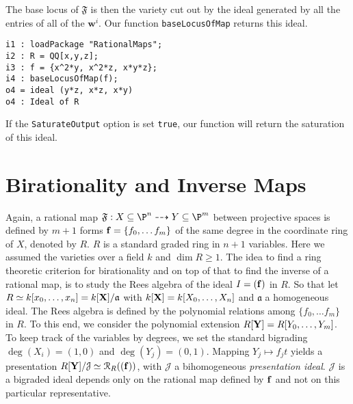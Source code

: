 \documentclass[11pt]{amsart}
\numberwithin{equation}{theorem}
\def\ff{{\bf f}}
\def\XX{{\bf X}}
\def\YY{{\bf Y}}
\renewcommand{\:}{\colon}
\theoremstyle{theorem}
\begin{document}
The base locus of $\mathfrak{F}$ is then the variety cut out by the ideal generated by all the entries of all of the $\mathbf w^i$. Our function {\tt baseLocusOfMap}  returns this ideal.
{\scriptsize\color{blue}
\begin{verbatim}
i1 : loadPackage "RationalMaps";
i2 : R = QQ[x,y,z];
i3 : f = {x^2*y, x^2*z, x*y*z};
i4 : baseLocusOfMap(f);
o4 = ideal (y*z, x*z, x*y)
o4 : Ideal of R
\end{verbatim}
}
{\normalsize}
If the \verb=SaturateOutput= option is set {\tt true}, our function will return the saturation of this ideal.


\section{Birationality and Inverse Maps}

Again, a rational map $\mathfrak{F}:X\subseteq \P^n\dasharrow Y \subseteq \P^m$ between projective spaces is defined by $m+1$ forms $\ff=\{f_0,\ldots f_m\}$ of the same degree in the coordinate ring of $X$, denoted by  $R$. $R$ is a standard graded ring in $n+1$ variables. Here we assumed the varieties over a field $k$ and  $\dim R\geq 1$.
The idea to find a ring theoretic criterion for birationality and on top of that to find the inverse of a rational map, is to study the Rees algebra of the ideal $I=(\ff)$ in $R$. 
So that let  $R\simeq k[x_0,\ldots, x_n]=k[\XX]/\mathfrak{a}$ with $k[\XX]=k[X_0,\ldots, X_n]$ and $\mathfrak{a}$ a homogeneous ideal. The Rees algebra is defined by the polynomial relations among $\{f_0,\ldots f_m\}$ in $R$. To this end, we consider the polynomial extension $R[\YY]=R[Y_0,\ldots,Y_m]$. To keep track of the variables by degrees, we set the standard  bigrading $\deg(X_i)=(1,0)$ and $\deg(Y_j)=(0,1)$. Mapping $Y_j\mapsto f_jt$ yields
a presentation $R[\YY]/\mathcal{J}\simeq {\mathcal R}_R((\ff))$, with $\mathcal{J}$ a bihomogeneous {\em presentation
ideal}.
$\mathcal{J}$ is a bigraded ideal depends only on the rational map defined by $\ff$
and not on this particular representative.
\end{document}
